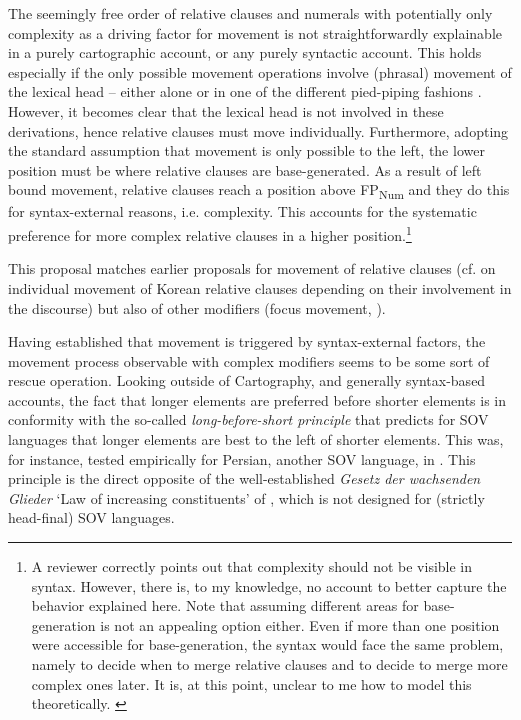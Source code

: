 \largerpage[-1]
The seemingly free order of relative clauses and numerals with potentially only complexity as a driving factor for movement is not straightforwardly explainable in a purely cartographic account, or any purely syntactic account. This holds especially if the only possible movement operations involve (phrasal) movement of the lexical head -- either alone or in one of the different pied-piping fashions \citep{cinque:2017:micro, cinque:2021:carto, cinque:2023:linearization, cinque:2025:superiority}. However, it becomes clear that the lexical head is not involved in these derivations, hence relative clauses must move individually. Furthermore, adopting the standard assumption that movement is only possible to the left, the lower position must be where relative clauses are base-generated. As a result of left bound movement, relative clauses reach a position above FP\textsubscript{Num} and they do this for syntax-external reasons, i.e. complexity. This accounts for the systematic preference for more complex relative clauses in a higher position.\footnote{A reviewer correctly points out that complexity should not be visible in syntax. However, there is, to my knowledge, no account to better capture the behavior explained here. Note that assuming different areas for base-generation is not an appealing option either. Even if more than one position were accessible for base-generation, the syntax would face the same problem, namely to decide when to merge relative clauses and to decide to merge more complex ones later. It is, at this point, unclear to me how to model this theoretically. \label{footnote complexity}}

This proposal matches earlier proposals for movement of relative clauses (cf. \citealt{kim:2019:syntax} on individual movement of  Korean relative clauses depending on their involvement in the discourse) but also of other modifiers (focus movement, \citealt{giusti:1996:is, dimitrova:1998:fragments, ihsane:2001:specific, aboh:2004:topic, aboh:2006:when, svenonius:2008:position}).

Having established that movement is triggered by syntax-external factors, the movement process observable with complex modifiers seems to be some sort of rescue operation. Looking outside of Cartography, and generally syntax-based accounts, the fact that longer elements are preferred before shorter elements is in conformity with the so-called \textit{long-before-short principle} that predicts for SOV languages that longer elements are best to the left of shorter elements. This was, for instance, tested empirically for  Persian, another SOV language, in \citet{faghiri:2020:word}. This principle is the direct opposite of the well-established \textit{Gesetz der wachsenden Glieder} `Law of increasing constituents' of \citet{behaghel:1909:glieder}, which is not designed for (strictly head-final) SOV languages. 

